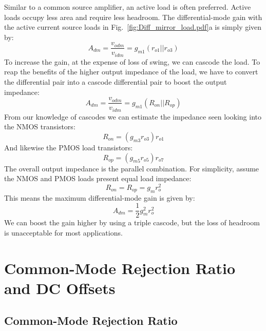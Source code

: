 Similar to a common source amplifier, an active load is often preferred.  Active loads occupy less area and require less headroom.  The differential-mode gain with the active current source loads in Fig.~\ref{fig:Diff_mirror_load.pdf}a is simply given by:
%
\begin{equation}
	{A_{dm}} = \frac{{{v_{odm}}}}{{{v_{idm}}}} = {g_{m1}}\left( {{r_{o1}}||{r_{o3}}} \right)
\end{equation}
%
To increase the gain, at the expense of loss of swing, we can cascode the load.  To reap the benefits of the higher output impedance of the load, we have to convert the differential pair into a cascode differential pair to boost the output impedance:
%
\begin{equation}
	{A_{dm}} = \frac{{{v_{odm}}}}{{{v_{idm}}}} = {g_{m1}}\left( {{R_{on}}||{R_{op}}} \right) 
\end{equation}
%
From our knowledge of cascodes we can estimate the impedance seen looking into the NMOS transistors:
%
\begin{equation}
	{R_{on}} = \left( {{g_{m3}}{r_{o3}}} \right){r_{o1}} 
\end{equation}
%
And likewise the PMOS load transistors:
\begin{equation}
	{R_{op}} = \left( {{g_{m5}}{r_{o5}}} \right){r_{o7}}
\end{equation}
%
The overall output impedance is the parallel combination.  For simplicity, assume the NMOS and PMOS loads present equal load impedance:
%
\begin{equation}
	{R_{on}} = {R_{op}} = {g_m}r_o^2
\end{equation}
%
This means the maximum differential-mode gain is given by:
%
\begin{equation}
	{A_{dm}} = \frac{1}{2}g_m^2r_o^2
\end{equation}
%
We can boost the gain higher by using a triple cascode, but the loss of headroom is unacceptable for most applications.





\section{Common-Mode Rejection Ratio and DC Offsets}





\subsection{Common-Mode Rejection Ratio}

